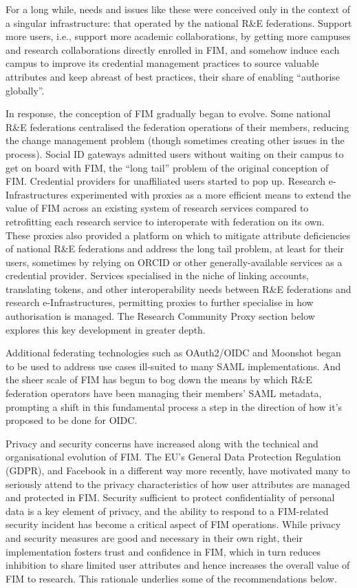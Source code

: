 \documentclass[fleqn,11pt]{wlscirep}
\begin{document}
{For a long while, needs and issues like these were conceived only in the context of a singular infrastructure: that operated by the national R\&E federations. Support more users, i.e., support more academic collaborations, by getting more campuses and research collaborations directly enrolled in FIM, and somehow induce each campus to improve its credential management practices to source valuable attributes and keep abreast of best practices, their share of enabling “authorise globally”. 

In response, the conception of FIM gradually began to evolve. Some national R\&E federations centralised the federation operations of their members, reducing the change management problem (though sometimes creating other issues in the process). Social ID gateways admitted users without waiting on their campus to get on board with FIM, the “long tail” problem of the original conception of FIM. Credential providers for unaffiliated users started to pop up. Research e-Infrastructures experimented with proxies as a more efficient means to extend the value of FIM across an existing system of research services compared to retrofitting each research service to interoperate with federation on its own. These proxies also provided a platform on which to mitigate attribute deficiencies of national R\&E federations and address the long tail problem, at least for their users, sometimes by relying on ORCID\cite{orcid} or other generally-available services as a credential provider. Services specialised in the niche of linking accounts, translating tokens, and other interoperability needs between R\&E federations and research e-Infrastructures, permitting proxies to further specialise in how authorisation is managed. The Research Community Proxy section below explores this key development in greater depth.

Additional federating technologies such as OAuth2/OIDC\cite{oidc} and Moonshot\cite{moonshot} began to be used to address use cases ill-suited to many SAML implementations. And the sheer scale of FIM has begun to bog down the means by which R\&E federation operators have been managing their members’ SAML metadata, prompting a shift in this fundamental process a step in the direction of how it’s proposed to be done for OIDC\cite{oidcfed}. 

Privacy and security concerns have increased along with the technical and organisational evolution of FIM. The EU’s General Data Protection Regulation (GDPR)\cite{GDPR:2016}\cite{eugdpr}, and Facebook in a different way more recently, have motivated many to seriously attend to the privacy characteristics of how user attributes are managed and protected in FIM\cite{assessdp}\cite{attributerelease}\cite{baseline}\cite{dpcoco}. Security sufficient to protect confidentiality of personal data is a key element of privacy, and the ability to respond to a FIM-related security incident has become a critical aspect of FIM operations\cite{sirtfi}. While privacy and security measures are good and necessary in their own right, their implementation fosters trust and confidence in FIM, which in turn reduces inhibition to share limited user attributes and hence increases the overall value of FIM to research. This rationale underlies some of the recommendations below.

}
\end{document}
